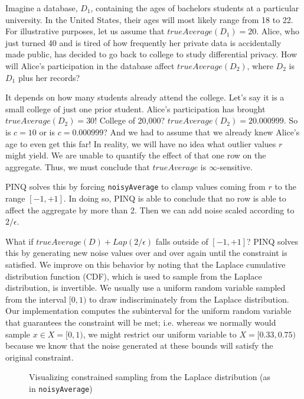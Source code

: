 \documentclass[12pt]{report}
\begin{document}
Imagine a database, $D_1$, containing the ages of bachelors students at a particular university.
In the United States, their ages will most likely range from 18 to 22.
For illustrative purposes, let us assume that $trueAverage(D_1) = 20$.
Alice, who just turned 40 and is tired of how frequently her private data is accidentally made public, has decided to go back to college to study differential privacy.
How will Alice's participation in the database affect $trueAverage(D_2)$, where $D_2$ is $D_1$ plus her records?

It depends on how many students already attend the college.
Let's say it is a small college of just one prior student.
Alice's participation has brought $trueAverage(D_2) = 30$!
College of 20,000?
$trueAverage(D_2) = 20.000999$.
So is $c=10$ or is $c=0.000999$?
And we had to assume that we already knew Alice's age to even get this far!
In reality, we will have no idea what outlier values $r$ might yield.
We are unable to quantify the effect of that one row on the aggregate.
Thus, we must conclude that $trueAverage$ is $\infty$-sensitive.

PINQ solves this by forcing \texttt{noisyAverage} to clamp values coming from $r$ to the range $[-1,+1]$.
In doing so, PINQ is able to conclude that no row is able to affect the aggregate by more than 2.
Then we can add noise scaled according to $2/\epsilon$.

What if $trueAverage(D) + Lap(2/\epsilon)$ falls outside of $[-1,+1]$?
PINQ solves this by generating new noise values over and over again until the constraint is satisfied.
We improve on this behavior by noting that the Laplace cumulative distribution function (CDF), which is used to sample from the Laplace distribution, is invertible.
We usually use a uniform random variable sampled from the interval $[0,1)$ to draw indiscriminately from the Laplace distribution.
Our implementation computes the subinterval for the uniform random variable that guarantees the constraint will be met; i.e. whereas we normally would sample $x \in X=[0,1)$, we might restrict our uniform variable to $X=[0.33,0.75)$ because we know that the noise generated at these bounds will satisfy the original constraint.

\begin{figure}
    \centering
    \def\svgwidth{\columnwidth}
    
    \caption{Visualizing constrained sampling from the Laplace distribution (as in \lstinline{noisyAverage})}
\end{figure}
\end{document}
